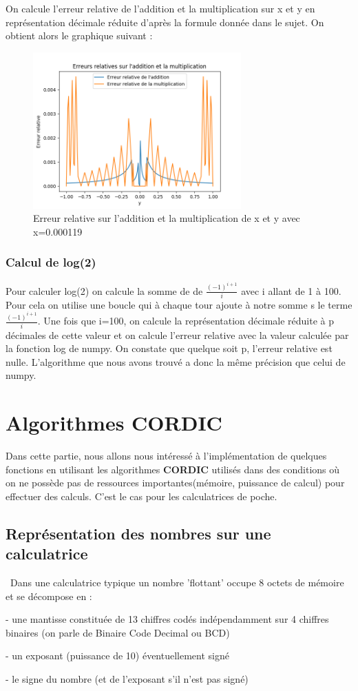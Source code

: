 \documentclass{article}
\begin{document}
On calcule l'erreur relative de l'addition et la multiplication sur x et y en représentation décimale réduite d'après la formule donnée dans le sujet. On obtient alors le graphique suivant :
\begin{figure}[h]
    \centering
    \centerline{\includegraphics[width=8cm]{Figure_1.png}}
    \caption{Erreur relative sur l'addition et la multiplication de x et y avec x=0.000119}
    \label{ERREUR}
\end{figure}

\subsubsection{Calcul de log(2)}

Pour calculer log(2) on calcule la somme de de $\frac{(-1)^{i+1}}{i}$ avec i allant de 1 à 100. Pour cela on utilise une boucle qui à chaque tour ajoute à notre somme s le terme $\frac{(-1)^{i+1}}{i}$. Une fois que i=100, on calcule la représentation décimale réduite à p décimales de cette valeur et on calcule l'erreur relative avec la valeur calculée par la fonction log de numpy. On constate que quelque soit p, l'erreur relative est nulle. L'algorithme que nous avons trouvé a donc la même précision que celui de numpy.

\section{Algorithmes CORDIC}
\indent Dans cette partie, nous allons nous intéressé à l'implémentation de quelques fonctions en utilisant les algorithmes \textbf{CORDIC} utilisés dans des conditions où on ne possède pas de ressources importantes(mémoire, puissance de calcul) pour effectuer des calculs. C'est le cas pour les calculatrices de poche.

\subsection{Représentation des nombres sur une calculatrice}
\
\indent Dans une calculatrice typique un nombre 'flottant' occupe 8 octets de mémoire et se décompose en :
\par     - une mantisse constituée de 13 chiffres codés indépendamment sur 4 chiffres binaires (on parle de Binaire Code Decimal ou BCD) 
\par     - un exposant (puissance de 10) éventuellement signé
\par     - le signe du nombre (et de l'exposant s'il n'est pas signé)
\end{document}
